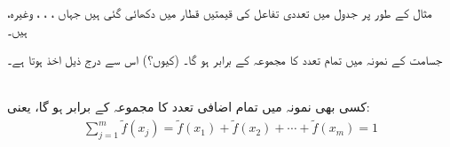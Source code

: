 مثال کے طور پر جدول  میں تعددی تفاعل کی قیمتیں قطار  میں دکھائی گئی ہیں جہاں ، ، ، وغیرہ،  ہیں۔

جسامت  کے نمونہ میں تمام تعدد کا مجموعہ  کے برابر ہو گا۔ (کیوں؟) اس سے درج ذیل اخذ ہوتا ہے۔

\quad {}\\
کسی بھی نمونہ میں تمام اضافی تعدد کا مجموعہ  کے برابر ہو گا، یعنی:
\begin{align*}
\sum_{j=1}^{m}\tilde{f}(x_j)=\tilde{f}(x_1)+\tilde{f}(x_2)+\cdots+\tilde{f}(x_m)=1
\end{align*}

